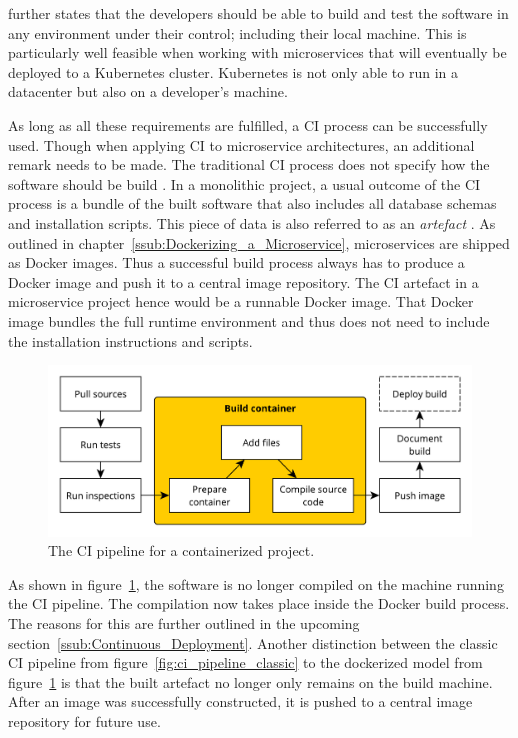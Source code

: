 \autocite[p. 62]{JezHumbleContinuousDelivery2010} further states that the
developers should be able to build and test the software in any environment
under their control; including their local machine. This is particularly well
feasible when working with microservices that will eventually be deployed to a
Kubernetes cluster. Kubernetes is not only able to run in a datacenter but also
on a developer's machine.

As long as all these requirements are fulfilled, a \ac{CI} process can be
successfully used. Though when applying \ac{CI} to microservice architectures,
an additional remark needs to be made. The traditional \ac{CI} process does
not specify how the software should be build \autocite[p.
18]{MatyasContinuousIntegration2007}. In a monolithic project, a usual outcome
of the \ac{CI} process is a bundle of the built software that also includes all
database schemas and installation scripts. This piece of data is also referred
to as an \textit{artefact} \autocite[p. 18]{MatyasContinuousIntegration2007}.
As outlined in chapter~\ref{ssub:Dockerizing_a_Microservice}, microservices are
shipped as Docker images. Thus a successful build process always has to produce
a Docker image and push it to a central image repository. The \ac{CI} artefact
in a microservice project hence would be a runnable Docker image. That Docker
image bundles the full runtime environment and thus does not need to include
the installation instructions and scripts.

\begin{figure}[H]
\begin{center}
  \includegraphics[scale=0.7]{images/figures/ci_container.pdf}
\end{center}
\caption{The \ac{CI} pipeline for a containerized project.}%
\label{fig:container_ci_pipeline}
\end{figure}

As shown in figure~\ref{fig:container_ci_pipeline}, the software is no longer
compiled on the machine running the \ac{CI} pipeline. The compilation now takes
place inside the Docker build process. The reasons for this are further
outlined in the upcoming section~\ref{ssub:Continuous_Deployment}. Another
distinction between the classic \ac{CI} pipeline from
figure~\ref{fig:ci_pipeline_classic} to the dockerized model from
figure~\ref{fig:container_ci_pipeline} is that the built artefact no longer
only remains on the build machine. After an image was successfully constructed,
it is pushed to a central image repository for future use.

